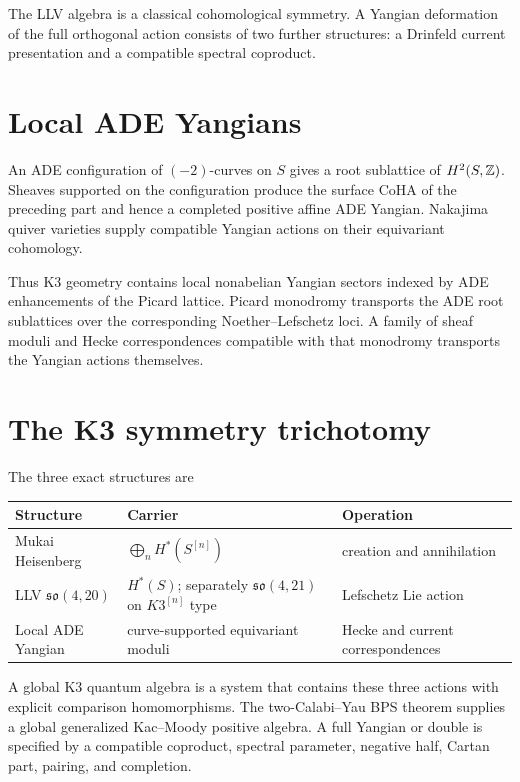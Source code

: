 The LLV algebra is a classical cohomological symmetry. A Yangian deformation of the full orthogonal action consists of two further structures: a Drinfeld current presentation and a compatible spectral coproduct.

\chapter{Local ADE Yangians}
An ADE configuration of $(-2)$-curves on $S$ gives a root sublattice of $H^2(S,\mathbb Z)$. Sheaves supported on the configuration produce the surface CoHA of the preceding part and hence a completed positive affine ADE Yangian. Nakajima quiver varieties supply compatible Yangian actions on their equivariant cohomology.

Thus K3 geometry contains local nonabelian Yangian sectors indexed by ADE enhancements of the Picard lattice. Picard monodromy transports the ADE root sublattices over the corresponding Noether--Lefschetz loci. A family of sheaf moduli and Hecke correspondences compatible with that monodromy transports the Yangian actions themselves.

\chapter{The K3 symmetry trichotomy}
The three exact structures are
\begin{center}
\small
\begin{tabularx}{0.96\textwidth}{@{}>{\raggedright\arraybackslash}p{}>{\raggedright\arraybackslash}X>{\raggedright\arraybackslash}p{}@{}}
\toprule
\textbf{Structure}&\textbf{Carrier}&\textbf{Operation}\\
\midrule
Mukai Heisenberg&$\bigoplus_nH^*(S^{[n]})$&creation and annihilation\\
LLV $\mathfrak{so}(4,20)$&$H^*(S)$; separately $\mathfrak{so}(4,21)$ on $K3^{[n]}$ type&Lefschetz Lie action\\
Local ADE Yangian&curve-supported equivariant moduli&Hecke and current correspondences\\
\bottomrule
\end{tabularx}
\end{center}
A global K3 quantum algebra is a system that contains these three actions with explicit comparison homomorphisms. The two-Calabi--Yau BPS theorem supplies a global generalized Kac--Moody positive algebra. A full Yangian or double is specified by a compatible coproduct, spectral parameter, negative half, Cartan part, pairing, and completion.

